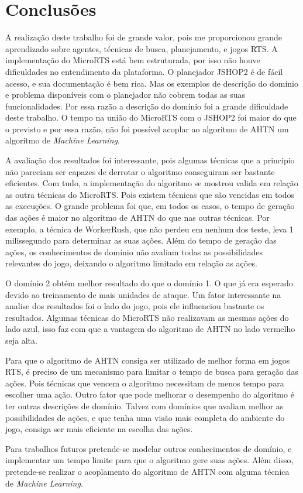 
\chapter{\label{chap:concl}Conclusões}

A realização deste trabalho foi de grande valor, pois me proporcionou grande aprendizado sobre agentes, técnicas de busca, planejamento, e jogos RTS.
A implementação do MicroRTS está bem estruturada, por isso não houve dificuldades no entendimento da plataforma.
O planejador JSHOP2 é de fácil acesso, e sua documentação é bem rica.
Mas os exemplos de descrição do domínio e problema disponíveis com o planejador não cobrem todas as suas funcionalidades.
Por essa razão a descrição do domínio foi a grande dificuldade deste trabalho.
O tempo na união do MicroRTS com o JSHOP2 foi maior do que o previsto e por essa razão, não foi possível acoplar ao algoritmo de AHTN um algoritmo de \textit{Machine Learning}.

A avaliação dos resultados foi interessante, pois algumas técnicas que a principio não pareciam ser capazes de derrotar o algoritmo conseguiram ser bastante eficientes.
Com tudo, a implementação do algoritmo se mostrou valida em relação as outra técnicas do MicroRTS.
Pois existem técnicas que são vencidas em todos as execuções.
O grande problema foi que, em todos os casos, o tempo de geração das ações é maior no algoritmo de AHTN do que nas outras técnicas.
Por exemplo, a técnica de WorkerRush, que não perdeu em nenhum dos teste, leva 1 milissegundo para determinar as suas ações.
Além do tempo de geração das ações, os conhecimentos de domínio não avaliam todas as possibilidades relevantes do jogo, deixando o algoritmo limitado em relação as ações.

O domínio 2 obtém melhor resultado do que o domínio 1.
O que já era esperado devido ao treinamento de mais unidades de ataque.
Um fator interessante na analise dos resultados foi o lado do jogo, pois ele influenciou bastante os resultados.
Algumas técnicas do MicroRTS não realizavam as mesmas ações do lado azul, isso faz com que a vantagem do algoritmo de AHTN no lado vermelho seja alta.

Para que o algoritmo de AHTN consiga ser utilizado de melhor forma em jogos RTS, é preciso de um mecanismo para limitar o tempo de busca para geração das ações.
Pois técnicas que vencem o algoritmo necessitam de menos tempo para escolher uma ação.
Outro fator que pode melhorar o desempenho do algoritmo é ter outras descrições de domínio.
Talvez com domínios que avaliam melhor as possibilidades de ações, e que tenha uma visão mais completa do ambiente do jogo, consiga ser mais eficiente na escolha das ações. 

Para trabalhos futuros pretende-se modelar outros conhecimentos de domínio, e implementar um tempo limite para que o algoritmo gere suas ações. 
Além disso, pretende-se realizar o acoplamento do algoritmo de AHTN com alguma técnica de \textit{Machine Learning}. 
